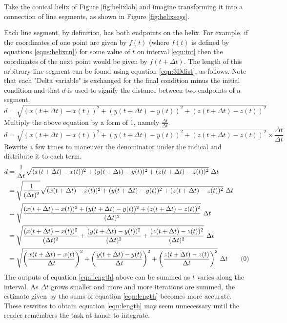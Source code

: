 \documentclass{article}
\begin{document}
Take the conical helix of Figure \ref{fig:helixlab} and imagine transforming it into a connection of line segments, as shown in Figure \ref{fig:helixsegs}.\par
Each line segment, by definition, has both endpoints on the helix. For example, if the coordinates of one point are given by $f(t)$ (where $f(t)$ is defined by equations \ref{eqns:helixcn}) for some value of $t$ on interval \ref{eqn:int} then the coordinates of the next point would be given by $f(t+\Delta t)$. The length of this arbitrary line segment can be found using equation \ref{eqn:3Ddist}, as follows. Note that each "Delta variable" is exchanged for the final condition minus the initial condition and that $d$ is used to signify the distance between two endpoints of a segment.
\begin{equation*}
    d = \sqrt{(x(t+\Delta t)-x(t))^2+(y(t+\Delta t)-y(t))^2+(z(t+\Delta t)-z(t))^2}
\end{equation*}
Multiply the above equation by a form of $1$, namely $\frac{\Delta t}{\Delta t}$.
\begin{equation*}
    d = \sqrt{(x(t+\Delta t)-x(t))^2+(y(t+\Delta t)-y(t))^2+(z(t+\Delta t)-z(t))^2}\times\frac{\Delta t}{\Delta t}
\end{equation*}
Rewrite a few times to maneuver the denominator under the radical and distribute it to each term.
\begin{align*}
    d &= \frac{1}{\Delta t}\sqrt{(x(t+\Delta t)-x(t))^2+(y(t+\Delta t)-y(t))^2+(z(t+\Delta t)-z(t))^2}\ \Delta t\\
    &= \sqrt{\frac{1}{(\Delta t)^2}}\sqrt{(x(t+\Delta t)-x(t))^2+(y(t+\Delta t)-y(t))^2+(z(t+\Delta t)-z(t))^2}\ \Delta t\\
    &= \sqrt{\frac{(x(t+\Delta t)-x(t))^2+(y(t+\Delta t)-y(t))^2+(z(t+\Delta t)-z(t))^2}{(\Delta t)^2}}\ \Delta t\\
    &= \sqrt{\frac{(x(t+\Delta t)-x(t))^2}{(\Delta t)^2}+\frac{(y(t+\Delta t)-y(t))^2}{(\Delta t)^2}+\frac{(z(t+\Delta t)-z(t))^2}{(\Delta t)^2}}\ \Delta t\\
    &= \sqrt{\left(\frac{x(t+\Delta t)-x(t)}{\Delta t}\right)^2+\left(\frac{y(t+\Delta t)-y(t)}{\Delta t}\right)^2+\left(\frac{z(t+\Delta t)-z(t)}{\Delta t}\right)^2}\ \Delta t\tag{\theequation}\label{eqn:length}
    \stepcounter{equation}
\end{align*}
The outputs of equation \ref{eqn:length} above can be summed as $t$ varies along the interval. As $\Delta t$ grows smaller and more and more iterations are summed, the estimate given by the sums of equation \ref{eqn:length} becomes more accurate. These rewrites to obtain equation \ref{eqn:length} may seem unnecessary until the reader remembers the task at hand: to integrate.\par
\end{document}
